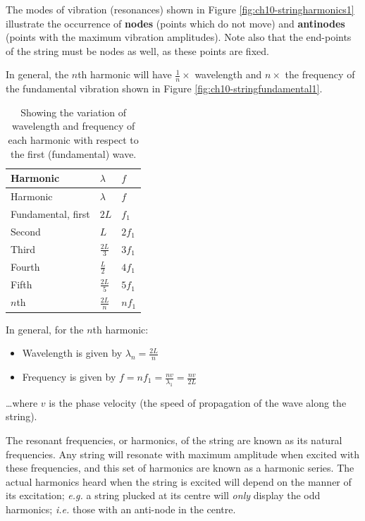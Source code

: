 \documentclass[
]{book}
\providecommand{\tightlist}{%
  \setlength{\itemsep}{0pt}\setlength{\parskip}{0pt}}
\begin{document}
The modes of vibration (resonances) shown in Figure \ref{fig:ch10-stringharmonics1} illustrate the occurrence of \textbf{nodes} (points which do not move) and \textbf{antinodes} (points with the maximum vibration amplitudes). Note also that the end-points of the string must be nodes as well, as these points are fixed.

In general, the \(n\)th harmonic will have \(\frac{1}{n} \times\) wavelength and \(n \times\) the frequency of the fundamental vibration shown in Figure \ref{fig:ch10-stringfundamental1}.

\begin{longtable}[]{@{}lll@{}}
\caption{\label{tab:ch10-standingfrequencies} Showing the variation of wavelength and frequency of each harmonic with respect to the first (fundamental) wave.}\tabularnewline
\toprule()
Harmonic & \(\lambda\) & \(f\) \\
\midrule()
\endfirsthead
\toprule()
Harmonic & \(\lambda\) & \(f\) \\
\midrule()
\endhead
Fundamental, first & \(2L\) & \(f_1\) \\
Second & \(L\) & \(2f_1\) \\
Third & \(\frac{2L}{3}\) & \(3f_1\) \\
Fourth & \(\frac{L}{2}\) & \(4f_1\) \\
Fifth & \(\frac{2L}{5}\) & \(5f_1\) \\
\(n\)th & \(\frac{2L}{n}\) & \(nf_1\) \\
\bottomrule()
\end{longtable}

In general, for the \(n\)th harmonic:

\begin{itemize}
\tightlist
\item
  Wavelength is given by \(\lambda_n = \frac{2L}{n}\)
\item
  Frequency is given by \(f = nf_1 = \frac{nv}{\lambda_1} = \frac{nv}{2L}\)
\end{itemize}

\ldots where \(v\) is the phase velocity (the speed of propagation of the wave along the string).

The resonant frequencies, or harmonics, of the string are known as its natural frequencies. Any string will resonate with maximum amplitude when excited with these frequencies, and this set of harmonics are known as a harmonic series. The actual harmonics heard when the string is excited will depend on the manner of its excitation; \emph{e.g.} a string plucked at its centre will \emph{only} display the odd harmonics; \emph{i.e.} those with an anti-node in the centre.
\end{document}
